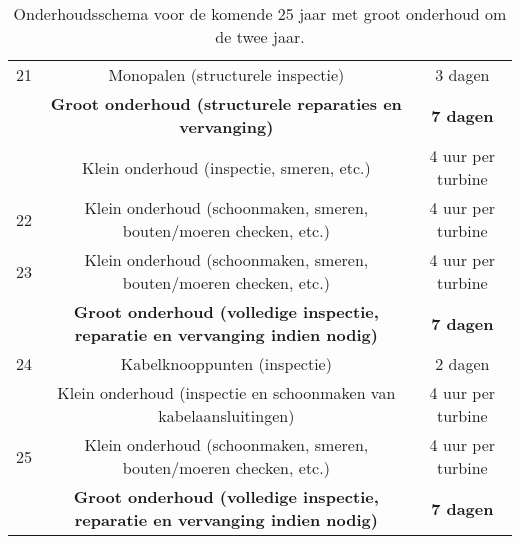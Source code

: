 \begin{table}[H]
{\begin{tabular}{|c|c|c|}
\hline
21 & Monopalen (structurele inspectie) & 3 dagen \\
   & \cellcolor{gray!25} \textbf{Groot onderhoud (structurele reparaties en vervanging)} & \cellcolor{gray!25} \textbf{7 dagen} \\
   & Klein onderhoud (inspectie, smeren, etc.) & 4 uur per turbine \\
\hline
22 & Klein onderhoud (schoonmaken, smeren, bouten/moeren checken, etc.) & 4 uur per turbine \\
\hline
23 & Klein onderhoud (schoonmaken, smeren, bouten/moeren checken, etc.) & 4 uur per turbine \\
  & \cellcolor{gray!25} \textbf{Groot onderhoud (volledige inspectie, reparatie en vervanging indien nodig)} & \cellcolor{gray!25} \textbf{7 dagen} \\
\hline
24 & Kabelknooppunten (inspectie) & 2 dagen \\
   & Klein onderhoud (inspectie en schoonmaken van kabelaansluitingen) & 4 uur per turbine \\
\hline
25 & Klein onderhoud (schoonmaken, smeren, bouten/moeren checken, etc.) & 4 uur per turbine \\
  & \cellcolor{gray!25} \textbf{Groot onderhoud (volledige inspectie, reparatie en vervanging indien nodig)} & \cellcolor{gray!25} \textbf{7 dagen} \\
\hline
\end{tabular}
}
\caption{Onderhoudsschema voor de komende 25 jaar met groot onderhoud om de twee jaar.}
\label{tab:onderhoudsschema}
\end{table}